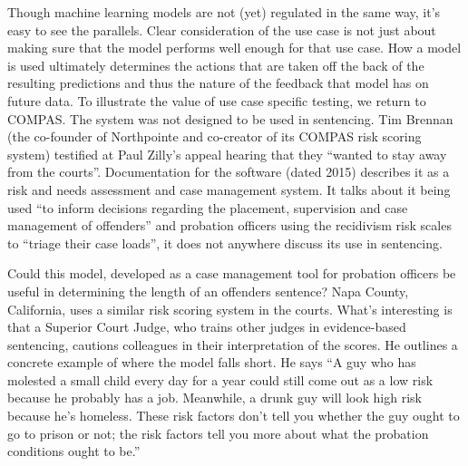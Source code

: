 Though machine learning models are not (yet) regulated in the same way, it's easy to see the parallels. Clear consideration of the use case is not just about making sure that the model performs well enough for that use case. How a model is used ultimately determines the actions that are taken off the back of the resulting predictions and thus the nature of the feedback that model has on future data. To illustrate the value of use case specific testing, we return to COMPAS\cite{ProPub2}. The system was not designed to be used in sentencing. Tim Brennan (the co-founder of Northpointe and co-creator of its COMPAS risk scoring system) testified at Paul Zilly's appeal hearing that they ``wanted to stay away from the courts''. Documentation\cite{COMPASguide} for the software (dated 2015) describes it as a risk and needs  assessment and case management system. It talks about it being used ``to inform decisions regarding the placement, supervision and case management of offenders'' and probation officers using the recidivism risk scales to ``triage their case loads'', it does not anywhere discuss its use in sentencing.

Could this model, developed as a case management tool for probation officers be useful in determining the length of an offenders sentence? Napa County, California, uses a similar risk scoring system in the courts. What's interesting is that a Superior Court Judge, who trains other judges in evidence-based sentencing, cautions colleagues in their interpretation of the scores. He outlines a concrete example of where the model falls short. He says ``A guy who has molested a small child every day for a year could still come out as a low risk because he probably has a job. Meanwhile, a drunk guy will look high risk because he’s homeless. These risk factors don’t tell you whether the guy ought to go to prison or not; the risk factors tell you more about what the probation conditions ought to be.”\cite{ProPub2}

